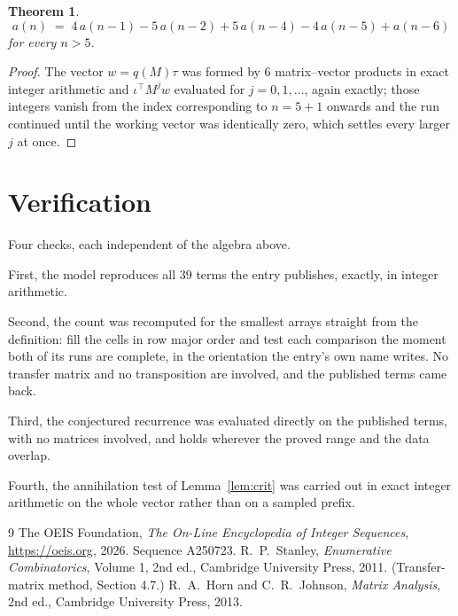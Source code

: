 \documentclass[11pt,a4paper]{article}
\theoremstyle{plain}
\newtheorem{theorem}{Theorem}
\theoremstyle{definition}
\begin{document}
\begin{theorem}
\[
a(n)\;=\;4\,a(n-1) - 5\,a(n-2) + 5\,a(n-4) - 4\,a(n-5) + a(n-6)
\]
for every $n>5$.
\end{theorem}

\begin{proof}
The vector $w=q(M)\tau$ was formed by $6$ matrix--vector products in exact integer
arithmetic and $\iota^{\!\top}M^{j}w$ evaluated for $j=0,1,\dots$, again exactly; those
integers vanish from the index corresponding to $n=5+1$ onwards and the run continued
until the working vector was identically zero, which settles every larger $j$ at once.
\end{proof}

\section{Verification}

Four checks, each independent of the algebra above.

First, the model reproduces all $39$ terms the entry publishes, exactly, in integer
arithmetic.

Second, the count was recomputed for the smallest arrays straight from the definition: fill the
cells in row major order and test each comparison the moment both of its runs are complete,
in the orientation the entry's own name writes. No transfer matrix and no transposition are
involved, and the published terms came back.

Third, the conjectured recurrence was evaluated directly on the published terms, with no
matrices involved, and holds wherever the proved range and the data overlap.

Fourth, the annihilation test of Lemma~\ref{lem:crit} was carried out in exact integer
arithmetic on the whole vector rather than on a sampled prefix.

\begin{thebibliography}{9}
 The OEIS Foundation, \emph{The On-Line Encyclopedia of Integer
Sequences}, \url{https://oeis.org}, 2026. Sequence A250723.
 R.~P.~Stanley, \emph{Enumerative Combinatorics}, Volume 1, 2nd ed.,
Cambridge University Press, 2011. (Transfer-matrix method, Section 4.7.)
 R.~A.~Horn and C.~R.~Johnson, \emph{Matrix Analysis}, 2nd ed., Cambridge
University Press, 2013.
\end{thebibliography}
\end{document}
